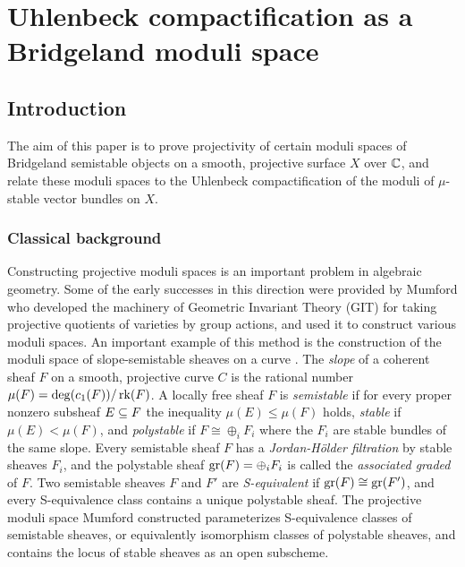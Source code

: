 \chapter{Uhlenbeck compactification as a Bridgeland moduli space}



\section{Introduction}
The aim of this paper is to prove projectivity of certain moduli spaces of Bridgeland semistable objects on a smooth, projective surface $X$ over $\mathbb{C}$, and relate these moduli spaces to the Uhlenbeck compactification of the moduli of $\mu$-stable vector bundles on $X$.

\subsection*{Classical background}

Constructing projective moduli spaces is an important problem in algebraic geometry. Some of the early successes in this direction were provided by Mumford who developed the machinery of Geometric Invariant Theory (GIT) for taking projective quotients of varieties by group actions, and used it to construct various moduli spaces. An important example of this method is the construction of the moduli space of slope-semistable sheaves on a curve \cite{mumford}. The \textit{slope} of a coherent sheaf $F$ on a smooth, projective curve $C$ is the rational number $\mu(F) = \deg(c_1(F))/\operatorname{\mathrm{rk}}(F)$. A locally free sheaf $F$ is \textit{semistable} if for every proper nonzero subsheaf $E \subseteq F$ the inequality $\mu(E) \le \mu(F)$ holds, \textit{stable} if $\mu(E) < \mu(F)$, and \textit{polystable} if $F \cong \oplus_i F_i$ where the $F_i$ are stable bundles of the same slope. Every semistable sheaf $F$ has a \textit{Jordan-H\"older filtration} by stable sheaves $F_i$, and the polystable sheaf $\operatorname{\mathrm{gr}}(F) = \oplus_i F_i$ is called the \textit{associated graded} of $F$. Two semistable sheaves $F$ and $F'$ are \textit{S-equivalent} if $\operatorname{\mathrm{gr}}(F) \cong \operatorname{\mathrm{gr}}(F')$, and every S-equivalence class contains a unique polystable sheaf. The projective moduli space Mumford constructed parameterizes S-equivalence classes of semistable sheaves, or equivalently isomorphism classes of polystable sheaves, and contains the locus of stable sheaves as an open subscheme.

